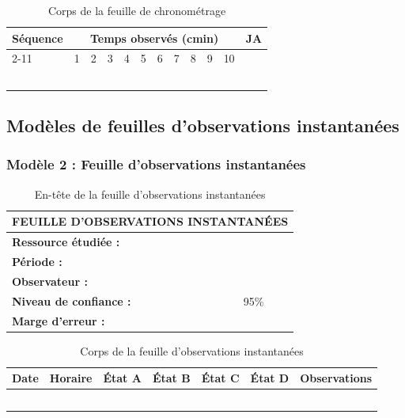 \documentclass[a4paper,12pt]{article}
\begin{document}
\begin{table}[ht]
\centering
\begin{tabular}{|l|c|c|c|c|c|c|c|c|c|c|c|}
\hline
\textbf{Séquence} & \multicolumn{10}{|c|}{\textbf{Temps observés (cmin)}} & \textbf{JA} \\
\cline{2-11}
 & 1 & 2 & 3 & 4 & 5 & 6 & 7 & 8 & 9 & 10 & \\
\hline
& & & & & & & & & & & \\
& & & & & & & & & & & \\
& & & & & & & & & & & \\
& & & & & & & & & & & \\
& & & & & & & & & & & \\
\hline
\end{tabular}
\caption{Corps de la feuille de chronométrage}
\end{table}

\subsection{Modèles de feuilles d'observations instantanées}

\subsubsection{Modèle 2 : Feuille d'observations instantanées}

\begin{table}[ht]
\centering
\begin{tabular}{|l|l|}
\hline
\multicolumn{2}{|c|}{\textbf{FEUILLE D'OBSERVATIONS INSTANTANÉES}} \\
\hline
\textbf{Ressource étudiée :} & \\
\textbf{Période :} & \\
\textbf{Observateur :} & \\
\textbf{Niveau de confiance :} & 95\% \\
\textbf{Marge d'erreur :} & \\
\hline
\end{tabular}
\caption{En-tête de la feuille d'observations instantanées}
\end{table}

\begin{table}[ht]
\centering
\begin{tabular}{|c|c|c|c|c|c|c|}
\hline
\textbf{Date} & \textbf{Horaire} & \textbf{État A} & \textbf{État B} & \textbf{État C} & \textbf{État D} & \textbf{Observations} \\
\hline
& & & & & & \\
& & & & & & \\
& & & & & & \\
& & & & & & \\
& & & & & & \\
\hline
\end{tabular}
\caption{Corps de la feuille d'observations instantanées}
\end{table}
\end{document}
